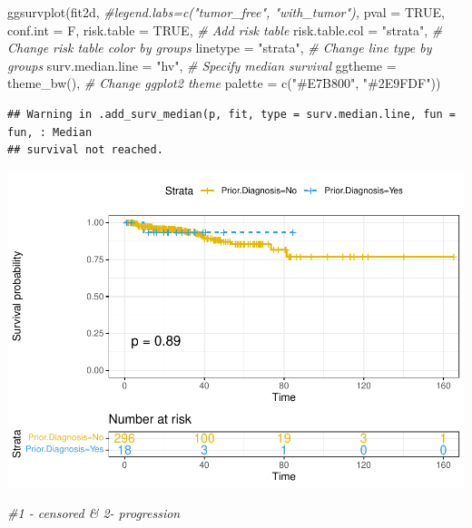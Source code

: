\documentclass[
  11pt,
]{article}
\newenvironment{Shaded}{\begin{snugshade}}{\end{snugshade}}
\newcommand{\AttributeTok}[1]{\textcolor[rgb]{0.77,0.63,0.00}{#1}}
\newcommand{\CommentTok}[1]{\textcolor[rgb]{0.56,0.35,0.01}{\textit{#1}}}
\newcommand{\ConstantTok}[1]{\textcolor[rgb]{0.00,0.00,0.00}{#1}}
\newcommand{\FunctionTok}[1]{\textcolor[rgb]{0.00,0.00,0.00}{#1}}
\newcommand{\NormalTok}[1]{#1}
\newcommand{\StringTok}[1]{\textcolor[rgb]{0.31,0.60,0.02}{#1}}
\begin{document}
\begin{Shaded}
\begin{Highlighting}[]
\FunctionTok{ggsurvplot}\NormalTok{(fit2d,}
          \CommentTok{\#legend.labs=c("tumor\_free", "with\_tumor"),}
          \AttributeTok{pval =} \ConstantTok{TRUE}\NormalTok{, }\AttributeTok{conf.int =}\NormalTok{ F,}
          \AttributeTok{risk.table =} \ConstantTok{TRUE}\NormalTok{, }\CommentTok{\# Add risk table}
          \AttributeTok{risk.table.col =} \StringTok{"strata"}\NormalTok{, }\CommentTok{\# Change risk table color by groups}
          \AttributeTok{linetype =} \StringTok{"strata"}\NormalTok{, }\CommentTok{\# Change line type by groups}
          \AttributeTok{surv.median.line =} \StringTok{"hv"}\NormalTok{, }\CommentTok{\# Specify median survival}
          \AttributeTok{ggtheme =} \FunctionTok{theme\_bw}\NormalTok{(), }\CommentTok{\# Change ggplot2 theme}
          \AttributeTok{palette =} \FunctionTok{c}\NormalTok{(}\StringTok{"\#E7B800"}\NormalTok{, }\StringTok{"\#2E9FDF"}\NormalTok{))}
\end{Highlighting}
\end{Shaded}

\begin{verbatim}
## Warning in .add_surv_median(p, fit, type = surv.median.line, fun = fun, : Median
## survival not reached.
\end{verbatim}

\includegraphics{new_surv_3_files/figure-latex/unnamed-chunk-12-1.pdf}

\begin{Shaded}
\begin{Highlighting}[]
\CommentTok{\#1 {-} censored \& 2{-} progression}
\end{Highlighting}
\end{Shaded}
\end{document}

